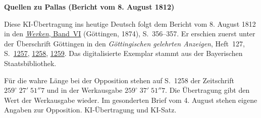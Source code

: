 \clearpage\thispagestyle{empty}
\begin{center}\textbf{Quellen zu Pallas (Bericht vom 8. August 1812)}\end{center}
\noindent Diese KI-Übertragung ins heutige Deutsch folgt dem Bericht vom 8. August 1812 in den \href{https://gdz.sub.uni-goettingen.de/id/PPN236007467}{\textit{Werken}, Band~VI} (Göttingen, 1874), S.~356--357. Er erschien zuerst unter der Überschrift Göttingen in den \textit{Göttingischen gelehrten Anzeigen}, Heft~127, S.~\href{https://api.digitale-sammlungen.de/iiif/image/v2/bsb10538682_00223/full/1600,/0/default.jpg}{1257}, \href{https://api.digitale-sammlungen.de/iiif/image/v2/bsb10538682_00224/full/1600,/0/default.jpg}{1258}, \href{https://api.digitale-sammlungen.de/iiif/image/v2/bsb10538682_00225/full/1600,/0/default.jpg}{1259}. Das digitalisierte Exemplar stammt aus der Bayerischen Staatsbibliothek.
\par\smallskip\noindent Für die wahre Länge bei der Opposition stehen auf S.~1258 der Zeitschrift $259^\circ\;27'\;51''7$ und in der Werkausgabe $259^\circ\;37'\;51''7$. Die Übertragung gibt den Wert der Werkausgabe wieder. Im gesonderten Brief vom 4. August stehen eigene Angaben zur Opposition. KI-Übertragung und KI-Satz.
\clearpage
